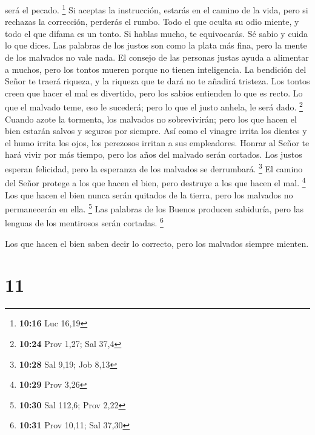 será el pecado. \footnote{\textbf{10:16} Luc 16,19}  Si
aceptas la instrucción, estarás en el camino de la vida, pero si
rechazas la corrección, perderás el rumbo.  Todo el que
oculta su odio miente, y todo el que difama es un tonto. 
Si hablas mucho, te equivocarás. Sé sabio y cuida lo que dices.
 Las palabras de los justos son como la plata más fina,
pero la mente de los malvados no vale nada.  El consejo
de las personas justas ayuda a alimentar a muchos, pero los tontos
mueren porque no tienen inteligencia.  La bendición del
Señor te traerá riqueza, y la riqueza que te dará no te añadirá
tristeza.  Los tontos creen que hacer el mal es
divertido, pero los sabios entienden lo que es recto.  Lo
que el malvado teme, eso le sucederá; pero lo que el justo anhela, le
será dado. \footnote{\textbf{10:24} Prov 1,27; Sal 37,4} 
Cuando azote la tormenta, los malvados no sobrevivirán; pero los que
hacen el bien estarán salvos y seguros por siempre.  Así
como el vinagre irrita los dientes y el humo irrita los ojos, los
perezosos irritan a sus empleadores.  Honrar al Señor te
hará vivir por más tiempo, pero los años del malvado serán cortados.
 Los justos esperan felicidad, pero la esperanza de los
malvados se derrumbará. \footnote{\textbf{10:28} Sal 9,19; Job 8,13}
 El camino del Señor protege a los que hacen el bien,
pero destruye a los que hacen el mal. \footnote{\textbf{10:29} Prov 3,26}
 Los que hacen el bien nunca serán quitados de la tierra,
pero los malvados no permanecerán en ella. \footnote{\textbf{10:30} Sal
  112,6; Prov 2,22}  Las palabras de los Buenos producen
sabiduría, pero las lenguas de los mentirosos serán cortadas.
\footnote{\textbf{10:31} Prov 10,11; Sal 37,30}

 Los que hacen el bien saben decir lo correcto, pero los
malvados siempre mienten.

\hypertarget{section-10}{%
\section{11}\label{section-10}}

